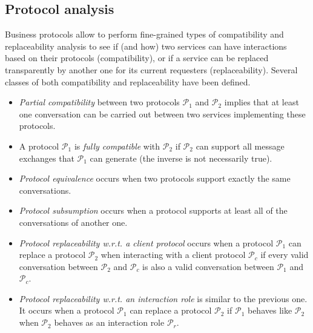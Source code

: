 
\subsection{Protocol analysis}


Business protocols allow to perform fine-grained types of compatibility and replaceability analysis to see if (and how) two services can have interactions based on their protocols (compatibility), or if a service can be replaced transparently by another one for its current requesters (replaceability). Several classes of both compatibility and replaceability have been defined.
\begin{itemize}

	\item \emph{Partial compatibility} between two protocols $\mathcal{P}_1$ and $\mathcal{P}_2$ implies that at least one conversation can be carried out between two services implementing these protocols.

  \item A protocol $\mathcal{P}_1$ is \emph{fully compatible} with $\mathcal{P}_2$ if $\mathcal{P}_2$ can support all message exchanges that $\mathcal{P}_1$ can generate (the inverse is not necessarily true).
  
  \item \emph{Protocol equivalence} occurs when two protocols support exactly the same conversations.
	
	\item \emph{Protocol subsumption} occurs when a protocol supports at least all of the conversations of another one.
	
	\item \emph{Protocol replaceability w.r.t. a client protocol} occurs when a protocol $\mathcal{P}_1$ can replace a protocol $\mathcal{P}_2$ when interacting with a client protocol $\mathcal{P}_c$ if every valid conversation between $\mathcal{P}_2$ and $\mathcal{P}_c$ is also a valid conversation between $\mathcal{P}_1$ and $\mathcal{P}_c$.
	
	\item \emph{Protocol replaceability w.r.t. an interaction role} is similar to the previous one. It occurs when a protocol $\mathcal{P}_1$ can replace a protocol $\mathcal{P}_2$ if $\mathcal{P}_1$ behaves like $\mathcal{P}_2$ when $\mathcal{P}_2$ behaves as an interaction role $\mathcal{P}_r$.

\end{itemize}

